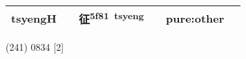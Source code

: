 \documentclass[14pt,a4paper]{scrartcl}
\begin{document}
\begin{longtable}[c]{@{}llllll@{}}
\begin{minipage}[t]{0.14\columnwidth}\raggedright\strut
tsyengH
\strut\end{minipage} &
\begin{minipage}[t]{0.14\columnwidth}\raggedright\strut
\strut\end{minipage} &
\begin{minipage}[t]{0.14\columnwidth}\raggedright\strut
征\textsuperscript{5f81~tsyeng}
\strut\end{minipage} &
\begin{minipage}[t]{0.14\columnwidth}\raggedright\strut
\strut\end{minipage} &
\begin{minipage}[t]{0.14\columnwidth}\raggedright\strut
pure:other
\strut\end{minipage}\tabularnewline
\bottomrule
\end{longtable}

(241) 0834 {[}2{]}
\end{document}
